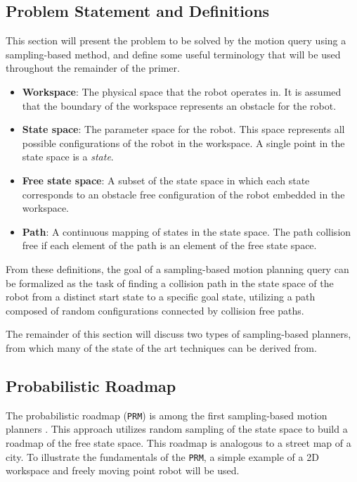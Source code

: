 \subsection {Problem Statement and Definitions}
This section will present the problem to be solved by the motion query using
a sampling-based method, and define some useful terminology that will be used
throughout the remainder of the primer.

\begin {itemize}
\item {\bf Workspace}: The physical space that the robot operates in.  It is
assumed that the boundary of the workspace represents an obstacle for the robot.
\item {\bf State space}: The parameter space for the robot.  This space 
represents all possible configurations of the robot in the workspace.  A single
point in the state space is a {\it state}.
\item {\bf Free state space}: A subset of the state space in which each state
corresponds to an obstacle free configuration of the robot embedded in the 
workspace.
\item {\bf Path}: A continuous mapping of states in the state space.  The path
collision free if each element of the path is an element of the free state 
space.
\end {itemize}

From these definitions, the goal of a sampling-based motion planning query can
be formalized as the task of finding a collision path in the state space of the
robot from a distinct start state to a specific goal state, utilizing a path
composed of random configurations connected by collision free paths.

The remainder of this section will discuss two types of sampling-based planners,
from which many of the state of the art techniques can be derived from.

\subsection {Probabilistic Roadmap}
The probabilistic roadmap ({\tt PRM}) is among the first sampling-based motion
planners \cite {Kavraki:1996}.  This approach utilizes random sampling of
the state space to build a roadmap of the free state space.  This roadmap is
analogous to a street map of a city.  To illustrate the fundamentals of the 
{\tt PRM}, a simple example of a 2D workspace and freely moving point robot will
 be used.

